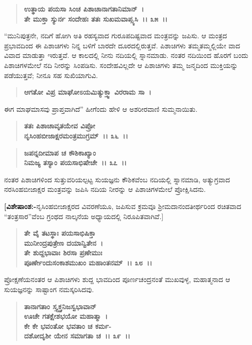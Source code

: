 \begin{verse}
\textbf{ಉತ್ಥಾಯ ಪಯಸಾ ಸಿಂಚ ಪಿಶಾಚಾನಾಗತಾನಿಮಾನ್~।}\\\textbf{ತೇ ಮುಕ್ತಾ ಸ್ಯುರ್ನ ಸಂದೇಹಃ ತತಃ ಸುಖಮವಾಪ್ಸ್ಯಸಿ~।। ೩೫~।।}
\end{verse}

“ಮುನಿಪುತ್ರನೇ, ನದಿಗೆ ಹೋಗಿ ಅತಿ ರಹಸ್ಯವಾದ ಗುರೂಪದಿಷ್ಟವಾದ ಮಂತ್ರವನ್ನು ಜಪಿಸು. ಆ ಮಂತ್ರದ ಪ್ರಭಾವದಿಂದ ಈ ಪಿಶಾಚಿಗಳು ನಿನ್ನ ಬಳಿಗೆ ಬಾರದೇ ದೂರದಲ್ಲಿರುತ್ತವೆ. ಪಿಶಾಚಿಗಳು ತಮ್ಮತಮ್ಮಲ್ಲಿಯೇ ವಾದ ವಿವಾದ ಮಾಡುತ್ತಾ ಇರುತ್ತವೆ. ಆ ಕಾಲದಲ್ಲಿ ನೀನು ನದಿಯಲ್ಲಿ ಸ್ನಾನಮಾಡು. ನಂತರ ನದಿಯಿಂದ ಹೊರಗೆ ಬಂದು ಪಿಶಾಚಿಗಳಮೇಲೆ ನದಿ ನೀರನ್ನು ಸಿಂಪಡಿಸು. ಸಂದೇಹವಿಲ್ಲದೇ ಆ ಪಿಶಾಚಿಗಳು ತಮ್ಮ ಜನ್ಮದಿಂದ ಮುಕ್ತಿಯನ್ನು ಪಡೆಯುತ್ತವೆ; ನೀನೂ ಸಹ ಸುಖಿಯಾಗುವಿ.

\begin{verse}
\textbf{ಆಗತೋ ವಿಪ್ರ ಮಾಘೋಽಯಮಿತ್ಯುಕ್ತ್ವಾ ವಿರರಾಮ ಸಾ~।}
\end{verse}

ಈಗ ಮಾಘಮಾಸವು ಪ್ರಾಪ್ತವಾಗಿದೆ” ಹೀಗೆಂದು ಹೇಳಿ ಆ ಅಶರೀರವಾಣಿ ಸುಮ್ಮನಾಯಿತು.

\begin{verse}
\textbf{ತತಃ ಪಿಶಾಚಾವೃತಯೇವ ವಿಪ್ರೋ}\\\textbf{ನೃಸಿಂಹಬೀಜಾಕ್ಷರಮಂತ್ರಮುಗ್ರಮ್~।। ೩೬~।।} 
\end{verse}

\begin{verse}
\textbf{ಜಪನ್ನದೀಮಾಪ ಚ ಕೌಶಿಕಾಖ್ಯಾಂ}\\\textbf{ನಿಮಜ್ಯ ತಸ್ಯಾಂ ಪಯಸಾಭಿಷೇಚೇ~।। ೩೭~।।}
\end{verse}

ನಂತರ ಪಿಶಾಚಿಗಳಿಂದ ಸುತ್ತುವರಿಯಲ್ಪಟ್ಟ ಸುಯಜ್ಞನು ಕೌಶಿಕವೆಂಬ ನದಿಯಲ್ಲಿ ಸ್ನಾನಮಾಡಿ, ಅತ್ಯುಗ್ರವಾದ ನರಸಿಂಹಬೀಜಾಕ್ಷರ ಮಂತ್ರವನ್ನು ಜಪಿಸಿ ನದಿಯ ನೀರನ್ನು ಆ ಪಿಶಾಚಿಗಳಮೇಲೆ ಪ್ರೋಕ್ಷಿಸಿದನು.

\textbf{[ವಿಶೇಷಾಂಶ:-}ನೃಸಿಂಹಬೀಜಾಕ್ಷರದ ವಿವರಣೆಯೂ, ಜಪಿಸುವ ಕ್ರಮವೂ ಶ‍್ರೀಮದಾನಂದ\-ತೀರ್ಥರಿಂದ ರಚಿತವಾದ “ತಂತ್ರಸಾರ”ವೆಂಬ ಗ್ರಂಥದ ನಾಲ್ಕನೆಯ ಅಧ್ಯಾಯದಲ್ಲಿ ನಿರೂಪಿತವಾಗಿವೆ.]

\begin{verse}
\textbf{ತೇ ವೈ ತಟಸ್ಥಾಃ ಪಯಸಾಭಿಷಿಕ್ತಾ} \\\textbf{ಮುನೀಂದ್ರಪುತ್ರೇಣ ದಯಾನ್ವಿತೇನ~।}\\\textbf{ತೇ ಶುದ್ದಭಾವಾಃ ಶಿರಸಾ ಪ್ರಣೇಮುಃ} \\\textbf{ಪೂರ್ಣೇಂದುಸಂಕಾಶಮುಖಂ ಮಹಾಂತನಮ್~।। ೩೮~।।}
\end{verse}

ಪ್ರೋಕ್ಷಣೆಯನಂತರ ಆ ಪಿಶಾಚಿಗಳು ಶುದ್ದ ಭಾವದಿಂದ ಪೂರ್ಣಚಂದ್ರನಂತೆ ಮುಖವುಳ್ಳ, ಮಹಾತ್ಮನಾದ ಆ ಸುಯಜ್ಞನನ್ನು ಸಾಷ್ಟಾಂಗ ನಮಸ್ಕರಿಸಿದವು.

\begin{verse}
\textbf{ತಾನಾಗತಾಂ ಸ್ತ್ಯ್ತಕ್ತನಿಜಸ್ವಭಾವಾನ್} \\\textbf{ಊಚೇ ಗತಕ್ಷೇಶಭಯೋ ಮಹಾತ್ಮಾ~।}\\\textbf{ಕೇ ಕೇ ಭವಂತೋ ಭವತಾಂ ಚ ಕರ್ಮ-} \\\textbf{ದಶೋದೃಶೀ ಯೇನ ಸಮಾಗತಾ ಚ~।। ೩೯~।। }
\end{verse}

